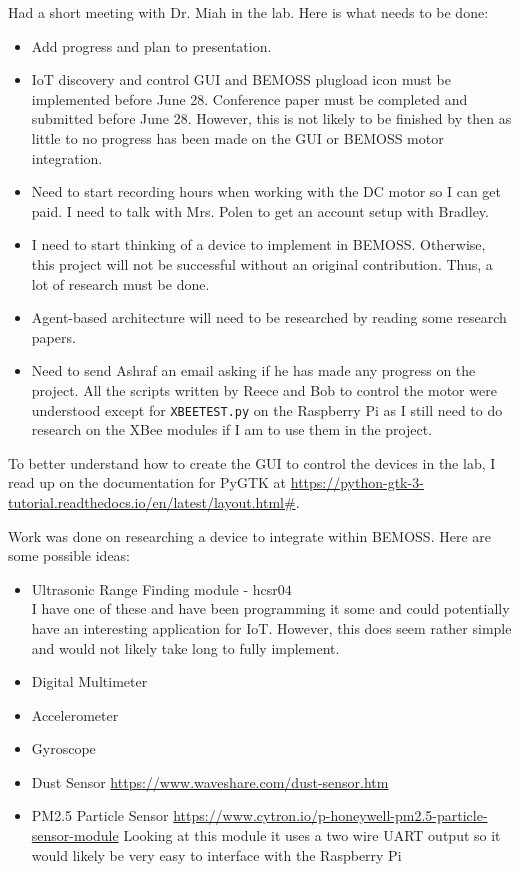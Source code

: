 \documentclass[fontsize=11pt, %
                             paper=letter, %
                             twoside, %
                             captions=tableheading,
                             index=totoc,
                             hyperref]{labbook}
\begin{document}
\begin{addmargin}[0cm]{0cm}
Had a short meeting with Dr. Miah in the lab. Here is what needs to be done:
\begin{itemize}
\item Add progress and plan to presentation.
\item IoT discovery and control GUI and BEMOSS plugload icon must be implemented before June 28. Conference paper must be completed and submitted before June 28. However, this is not likely to be finished by then as little to no progress has been made on the GUI or BEMOSS motor integration.
\item Need to start recording hours when working with the DC motor so I can get paid. I need to talk with Mrs. Polen to get an account setup with Bradley. 
\item I need to start thinking of a device to implement in BEMOSS. Otherwise, this project will not be successful without an original contribution. Thus, a lot of research must be done.
\item Agent-based architecture will need to be researched by reading some research papers.
\item Need to send Ashraf an email asking if he has made any progress on the project.
\bigbreak\noindent
All the scripts written by Reece and Bob to control the motor were understood except for \texttt{XBEETEST.py} on the Raspberry Pi as I still need to do research on the XBee modules if I am to use them in the project.
\end{itemize}

To better understand how to create the GUI to control the devices in the lab, I read up on the documentation for PyGTK at \url{https://python-gtk-3-tutorial.readthedocs.io/en/latest/layout.html#}. 

Work was done on researching a device to integrate within BEMOSS. Here are some possible ideas:
\begin{itemize}
\item Ultrasonic Range Finding module - hcsr$04$\\
I have one of these and have been programming it some and could potentially have an interesting application for IoT. However, this does seem rather simple and would not likely take long to fully implement.
\item Digital Multimeter
\item Accelerometer
\item Gyroscope
\item Dust Sensor \url{https://www.waveshare.com/dust-sensor.htm}
\item PM2.5 Particle Sensor \url{https://www.cytron.io/p-honeywell-pm2.5-particle-sensor-module} Looking at this module it uses a two wire UART output so it would likely be very easy to interface with the Raspberry Pi 
\end{itemize}


\end{addmargin}
\end{document}
